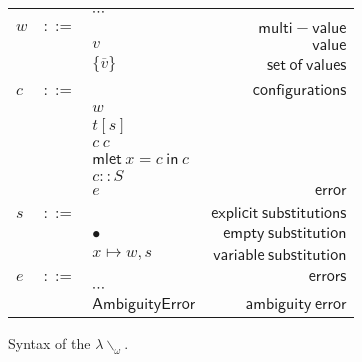 \documentclass[preprint,authoryear,sort&compress,9pt,nocopyrightspace]{article}
\newcommand{\ascripS}[1]{#1::S}
\newcommand{\oletP}[3]{\mathsf{mlet} \ x = #2 \ \mathsf{in}  \ #3}
\newcommand{\nameerror}{\mathsf{NameError}}
\newcommand{\typeerror}{\mathsf{TypeError}}
\newcommand{\dispatcherror}{\mathsf{DispatchError}}
\newcommand{\ambiguityerror}{\mathsf{AmbiguityError}}
\newcommand{\semanticC}{${\lambda}{\backslash}_\omega$}
\begin{document}
\begin{figure}[]
\begin{small}
\begin{center}
\hspace*{-2cm}
\begin{tabular}{|l c l r|}
\hline
&&$\cdots$&\\
$w$&$::=$&&$\mathsf {multi-value}$\\
&&$v$&$\mathsf {value}$\\
&&$\{\overline{v}\}$&$\mathsf {set \ of \ values}$\\
&&&\\
$c$&$::=$&&$\mathsf {configurations}$\\
&&$w$&\\
&&$t[s]$&\\
&&$c \ c $&\\
&&$\oletP {T}{c}{c}$&\\
&&$\ascripS{c}$&\\
&&$e$&$\mathsf {error}$\\
&&&\\
$s$&$::=$&&$\mathsf {explicit \ substitutions}$\\
&&$ \bullet$&$\mathsf {empty \ substitution}$\\
&&$x \mapsto w, s$&$\mathsf {variable \ substitution}$\\
&&&\\
$e$&$::=$&&$\mathsf {errors}$\\
&&$\cdots$&\\
&&$\ambiguityerror$&$\mathsf {ambiguity \ error}$\\
\hline
\end{tabular}
\hspace*{-2cm}
\caption{Syntax of the \semanticC.}
\label{figure:SYNTAX4}
\end{center}
\end{small}
\end{figure}
\end{document}
